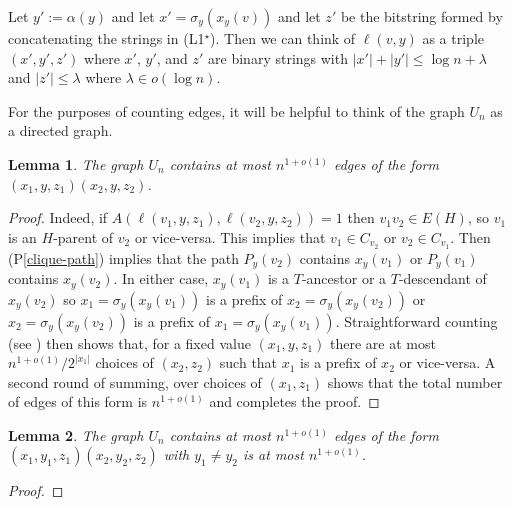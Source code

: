 \documentclass{article}
\newcommand{\pref}[1]{(P\ref{#1})}
\newtheorem{lemma}{Lemma}
\begin{document}
Let $y':=\alpha(y)$ and let $x'=\sigma_y(x_y(v))$ and let $z'$ be the bitstring formed by concatenating the strings in (L1$^\star$).  Then we can think of $\ell(v,y)$ as a triple $(x',y',z')$ where $x'$, $y'$, and $z'$ are binary strings with $|x'|+|y'|\le \log n + \lambda$ and $|z'|\le \lambda$ where $\lambda\in o(\log n)$.

For the purposes of counting edges, it will be helpful to think of the graph $U_n$ as a directed graph.

\begin{lemma}\label{flat-edges}
    The graph $U_n$ contains at most $n^{1+o(1)}$ edges of the form $(x_1,y,z_1)(x_2,y,z_2)$.
\end{lemma}

\begin{proof}
    Indeed, if $A(\ell(v_1,y,z_1),\ell(v_2,y,z_2))=1$ then $v_1v_2\in E(H)$, so $v_1$ is an $H$-parent of $v_2$ or vice-versa. This implies that $v_1\in C_{v_2}$ or $v_2\in C_{v_1}$.  Then \pref{clique-path} implies that the path $P_{y}(v_2)$ contains $x_y(v_1)$ or $P_y(v_1)$ contains $x_y(v_2)$.  In either case, $x_y(v_1)$ is a $T$-ancestor or a $T$-descendant of $x_y(v_2)$ so $x_1=\sigma_y(x_y(v_1))$ is a prefix of $x_2=\sigma_y(x_y(v_2))$ or $x_2=\sigma_y(x_y(v_2))$ is a prefix of $x_1=\sigma_y(x_y(v_1))$.  Straightforward counting (see \cite[Lemma~X]{esperet.joret.ea:sparse}) then shows that, for a fixed value $(x_1,y,z_1)$ there are at most $n^{1+o(1)}/2^{|x_1|}$ choices of $(x_2,z_2)$ such that $x_1$ is a prefix of $x_2$ or vice-versa.  A second round of summing, over choices of $(x_1,z_1)$ shows that the total number of edges of this form is $n^{1+o(1)}$ and completes the proof.
\end{proof}

\begin{lemma}\label{flat-edges}
    The graph $U_n$ contains at most $n^{1+o(1)}$ edges of the form $(x_1,y_1,z_1)(x_2,y_2,z_2)$ with $y_1\neq y_2$ is at most $n^{1+o(1)}$.
\end{lemma}

\begin{proof}

\end{proof}





\end{document}
